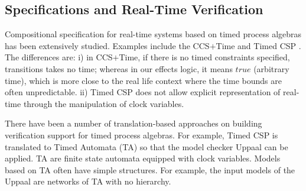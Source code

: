 \documentclass[acmsmall,review,anonymous]{acmart}\settopmatter{printfolios=true,printccs=false,printacmref=false}
\newcommand{\code}[1]{{\tt{\ensuremath{\m{#1}}}}}
\newcommand{\empt}{\textcolor{black}{\ensuremath{\epsilon}}}
\newcommand{\m}{\mathit}
\begin{document}



\subsection{Specifications and Real-Time Verification}






Compositional specification for real-time systems based on timed process algebras has been extensively studied. Examples include the CCS\code{\text{+}}Time \cite{yi1991ccs} and Timed CSP \cite{dong2008timed}.  
The differences are: 
i) in CCS\code{\text{+}}Time, if there is no timed constraints specified, transitions takes no time; whereas in our effects logic, it means \code{true} (arbitrary time), which is more close to the real life context where the time bounds are often unpredictable.
ii) Timed CSP does not allow explicit representation of real-time through the manipulation of clock variables.



There have been a number of translation-based approaches on building verification support for timed process algebras. For example, Timed CSP \cite{dong2008timed} is translated to Timed Automata (TA) so that the model checker Uppaal can be \cite{larsen1997uppaal} applied. 
TA are finite state automata equipped with clock variables. Models based on TA often have simple structures. For example, the input models of the Uppaal are networks of TA with no hierarchy. 
\end{document}
